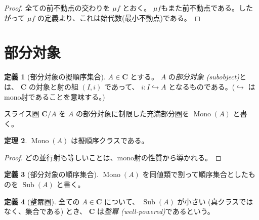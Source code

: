 \documentclass[dvipdfmx,uplatex,papersize,a4paper,10pt]{jsarticle}
\theoremstyle{definition}
\newtheorem{definition}{定義}[section]
\newtheorem{theorem}[definition]{定理}
\DeclareMathOperator{\Mono}{Mono}
\DeclareMathOperator{\Sub}{Sub}
\begin{document}
\begin{proof}
  全ての前不動点の交わりを $\mu f$ とおく。 $\mu f$もまた前不動点である。したがって $\mu f$ の定義より、これは始代数(最小不動点)である。
\end{proof}

\section{部分対象}

\begin{definition}[部分対象の擬順序集合]
  $A \in \mathbf{C}$ とする。 $A$ の\emph{部分対象 (subobject)}とは、 $\mathbf{C}$ の対象と射の組 $(I, i)$ であって、 $i \colon I \hookrightarrow A$ となるものである。($\hookrightarrow$ はmono射であることを意味する。)

  スライス圏 $\mathbf{C}/A$ を $A$ の部分対象に制限した充満部分圏を $\Mono(A)$ と書く。
\end{definition}

\begin{theorem}
  $\Mono(A)$ は擬順序クラスである。
\end{theorem}

\begin{proof}
  どの並行射も等しいことは、mono射の性質から導かれる。
\end{proof}

\begin{definition}[部分対象の順序集合]
  $\Mono(A)$ を同値類で割って順序集合としたものを $\Sub(A)$ と書く。
\end{definition}

\begin{definition}[整羃圏]
  全ての $A \in \mathbf{C}$ について、 $\Sub(A)$ が小さい (真クラスではなく、集合である) とき、 $\mathbf{C}$ は\emph{整羃 (well-powered)}であるという。
\end{definition}
\end{document}
